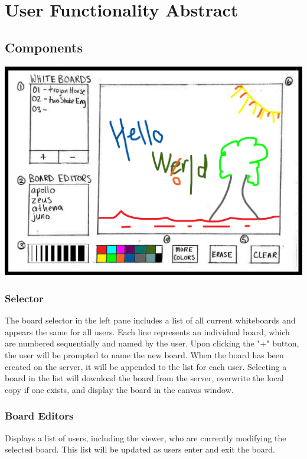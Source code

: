 \section{User Functionality Abstract}

\subsection{Components}

\includegraphics[keepaspectratio=1,width=6in]{img/gui-sketch.jpg}

\subsubsection{Selector}

The board selector in the left pane includes a list of all current whiteboards and appears the same for all users. Each line represents an individual board, which are numbered sequentially and named by the user. Upon clicking the "+" button, the user will be prompted to name the new board. When the board has been created on the server, it will be appended to the list for each user. Selecting a board in the list will download the board from the server, overwrite the local copy if one exists, and display the board in the canvas window. 

\subsubsection{Board Editors}

Displays a list of users, including the viewer, who are currently modifying the selected board. This list will be updated as users enter and exit the board.

